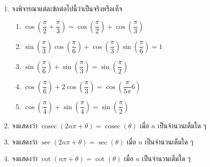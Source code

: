\begin{enumerate}[label=\arabic*., leftmargin=*]
\begin{enumerate}[label=\theenumi\arabic*), leftmargin=1.5em, itemsep=0.6em]
		\item $\sec \left( \dfrac{5\pi}{6} \right) + \operatorname{cosec} \left( \dfrac{7\pi}{3} \right) - \cos \left( \dfrac{4\pi}{3} \right)$
		\item $\sin \left( -\dfrac{7\pi}{6} \right) + \cos \left( -\dfrac{\pi}{3} \right) + \tan \left( \dfrac{5\pi}{4} \right)$
		\item $\sin \left( \dfrac{2\pi}{3} \right) \cos \left( \dfrac{2\pi}{3} \right) - \cot \left( -\dfrac{\pi}{6} \right) \tan \left( \dfrac{2\pi}{6} \right)$
		\item $\tan^{2} \left( \dfrac{\pi}{12} \right) + \cot^{2} \left( \dfrac{11\pi}{12} \right) - \sec^{2} \left( \dfrac{23\pi}{12} \right) - \operatorname{cosec}^{2} \left( \dfrac{13\pi}{12} \right)$

	\end{enumerate}
	
	\item จงพิจารณาแต่ละข้อต่อไปนี้ว่าเป็นจริงหรือเท็จ
	\begin{enumerate}[label=\theenumi\arabic*), leftmargin=1.5em, itemsep=0.6em]
		\everymath{\displaystyle}
		\item $\cos \left( \dfrac{\pi}{2} + \dfrac{\pi}{3} \right) = \cos \left( \dfrac{\pi}{2} \right) + \cos \left( \dfrac{\pi}{3} \right)$
		\item $\sin \left( \dfrac{\pi}{3} \right) \cos \left( \dfrac{\pi}{6} \right) + \cos \left( \dfrac{\pi}{3} \right) \sin \left( \dfrac{\pi}{6} \right) = 1$
		\item $\sin \left( \dfrac{\pi}{6} \right) + \sin \left( \dfrac{\pi}{3} \right) = \sin \left( \dfrac{\pi}{2} \right)$
		\item $\cos \left( \dfrac{\pi}{6} \right) + 2 \cos \left( \dfrac{\pi}{3} \right) = \cos \left( \dfrac{\pi}{5\pi}{6} \right)$
		\item $\cos \left( \dfrac{\pi}{4} \right) + \sin \left( \dfrac{\pi}{4} \right) = \sin \left( \dfrac{\pi}{2} \right)$
	\end{enumerate}
	
	\item จงแสดงว่า $\operatorname{cosec} \left( 2n\pi + \theta \right) = \operatorname{cosec} \left( \theta \right)$ เมื่อ $n$ เป็นจำนวนเต็มใด ๆ
	
	\item จงแสดงว่า $\sec \left( 2n\pi + \theta \right) = \sec \left( \theta \right)$ เมื่อ $n$ เป็นจำนวนเต็มใด ๆ
	
	\item จงแสดงว่า $\cot \left( n\pi + \theta \right) = \cot \left( \theta \right)$ เมื่อ $n$ เป็นจำนวนเต็มใด ๆ
\end{enumerate}
\newpage
